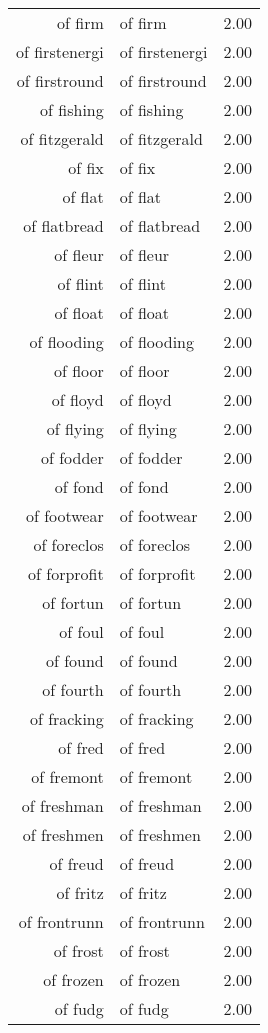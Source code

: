 \begin{table}[ht]
\begin{tabular}{rlr}
  of firm & of firm & 2.00 \\ 
  of firstenergi & of firstenergi & 2.00 \\ 
  of firstround & of firstround & 2.00 \\ 
  of fishing & of fishing & 2.00 \\ 
  of fitzgerald & of fitzgerald & 2.00 \\ 
  of fix & of fix & 2.00 \\ 
  of flat & of flat & 2.00 \\ 
  of flatbread & of flatbread & 2.00 \\ 
  of fleur & of fleur & 2.00 \\ 
  of flint & of flint & 2.00 \\ 
  of float & of float & 2.00 \\ 
  of flooding & of flooding & 2.00 \\ 
  of floor & of floor & 2.00 \\ 
  of floyd & of floyd & 2.00 \\ 
  of flying & of flying & 2.00 \\ 
  of fodder & of fodder & 2.00 \\ 
  of fond & of fond & 2.00 \\ 
  of footwear & of footwear & 2.00 \\ 
  of foreclos & of foreclos & 2.00 \\ 
  of forprofit & of forprofit & 2.00 \\ 
  of fortun & of fortun & 2.00 \\ 
  of foul & of foul & 2.00 \\ 
  of found & of found & 2.00 \\ 
  of fourth & of fourth & 2.00 \\ 
  of fracking & of fracking & 2.00 \\ 
  of fred & of fred & 2.00 \\ 
  of fremont & of fremont & 2.00 \\ 
  of freshman & of freshman & 2.00 \\ 
  of freshmen & of freshmen & 2.00 \\ 
  of freud & of freud & 2.00 \\ 
  of fritz & of fritz & 2.00 \\ 
  of frontrunn & of frontrunn & 2.00 \\ 
  of frost & of frost & 2.00 \\ 
  of frozen & of frozen & 2.00 \\ 
  of fudg & of fudg & 2.00 \\ 

\end{tabular}
\end{table}
